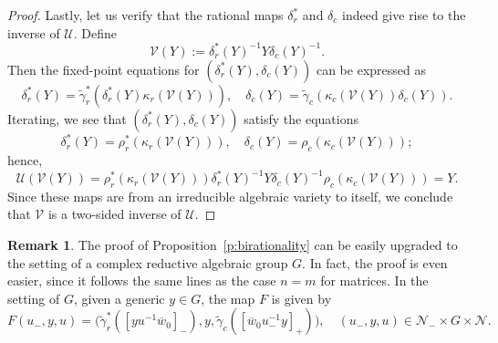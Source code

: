 \documentclass[11pt]{article}
\theoremstyle{definition}\newtheorem{definition}[theorem]{Definition}
\theoremstyle{definition}\newtheorem{remark}[theorem]{Remark}
\theoremstyle{remark}
\numberwithin{equation}{section}
\begin{document}
\begin{proof}
    Lastly, let us verify that the rational maps $\delta_r^*$ and $\delta_c$ indeed give rise to the inverse of $\mathcal{U}$. Define
    \begin{equation*}
        \mathcal{V}(Y) := \delta_r^*(Y)^{-1} Y \delta_c(Y)^{-1}.
    \end{equation*}
    Then the fixed-point equations for $(\delta_r^*(Y),\delta_c(Y))$ can be expressed as
    \begin{equation*}
        \delta_r^*(Y) = \tilde{\gamma}_r^*(\delta_r^*(Y)\kappa_r(\mathcal{V}(Y))), \quad \delta_c(Y) = \tilde{\gamma}_c(\kappa_c(\mathcal{V}(Y))\delta_c(Y)).
    \end{equation*}
    Iterating, we see that $(\delta_r^*(Y),\delta_c(Y))$ satisfy the equations
    \begin{equation*}
        \delta_r^*(Y) = \rho_r^*(\kappa_r(\mathcal{V}(Y))), \quad \delta_c(Y) = \rho_c(\kappa_c(\mathcal{V}(Y)));
    \end{equation*}
    hence,
    \begin{equation*}
        \mathcal{U}(\mathcal{V}(Y)) = \rho_r^*(\kappa_r(\mathcal{V}(Y))) \delta_r^*(Y)^{-1}Y \delta_c(Y)^{-1} \rho_c(\kappa_c(\mathcal{V}(Y))) = Y.
    \end{equation*}
    Since these maps are from an irreducible algebraic variety to itself, we conclude that $\mathcal{V}$ is a two-sided inverse of $\mathcal{U}$.
\end{proof}

\begin{remark}
    The proof of Proposition~\ref{p:birationality} can be easily upgraded to the setting of a complex reductive algebraic group $G$. In fact, the proof is even easier, since it follows the same lines as the case $n=m$ for matrices. In the setting of $G$, given a generic $y \in G$, the map $F$ is given by
    \begin{equation*}
        F(u_-,y,u) = \big( \tilde{\gamma}_r^*([yu^{-1}\overline{w}_0]_-), y,\tilde{\gamma}_c([\overline{w}_0u_-^{-1}y]_+)\big), \quad (u_-,y,u) \in \mathcal{N}_-\times G\times  \mathcal{N}.
    \end{equation*}
\end{remark}
\end{document}
